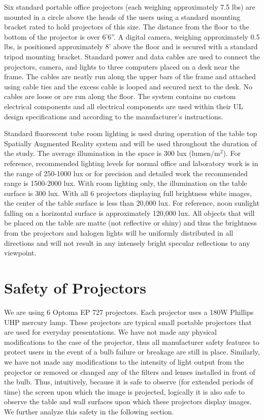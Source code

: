 \documentclass[10pt]{article}
\begin{document}
Six standard portable office projectors (each weighing approximately
7.5 lbs) are mounted in a circle above the heads of the users using a
standard mounting bracket rated to hold projectors of this size.  The distance
from the floor to the bottom of the projector is over 6'6''.  A
digital camera, weighing approximately 0.5 lbs, is positioned
approximately 8' above the floor and is secured with a standard tripod
mounting bracket.  Standard power and data cables are used to connect
the projectors, camera, and lights to three computers placed on a desk
near the frame.  The cables are neatly run along the upper bars of the
frame and attached using cable ties and the excess cable is looped and
secured next to the desk.  No cables are loose or are run along the
floor.  The system contains no custom electrical components and all
electrical components are used within their UL design specifications
and according to the manufacturer's instructions.

Standard fluorescent tube room lighting is used during operation of
the table top Spatially Augmented Reality system and will be used
throughout the duration of the study.  The average illumination in the
space is 300 lux (lumen/m$^2$).  For reference, recommended lighting
levels for normal office and laboratory work is in the range of
250-1000 lux or for precision and detailed work the recommended range
is 1500-2000 lux.  With room lighting only, the illumination on the
table surface is 300 lux.  With all 6 projectors displaying full
brightness white images, the center of the table surface is less than
20,000 lux.  For reference, noon sunlight falling on a horizontal
surface is approximately 120,000 lux.  All objects that will be placed
on the table are matte (not reflective or shiny) and thus the
brightness from the projectors and halogen lights will be uniformly
distributed in all directions and will not result in any intensely
bright specular reflections to any viewpoint.

\section{Safety of Projectors}

We are using 6 Optoma EP 727 projectors.  Each projector uses a 180W
Phillips UHP mercury lamp.  These projectors are typical small
portable projectors that are used for everyday presentations.  We have
not made any physical modifications to the case of the projector, thus
all manufacturer safety features to protect users in the event of a
bulb failure or breakage are still in place.  Similarly, we have not
made any modifications to the intensity of light output from the
projector or removed or changed any of the filters and lenses
installed in front of the bulb.  Thus, intuitively, because it is safe
to observe (for extended periods of time) the screen upon which the
image is projected, logically it is also safe to observe the table and
wall surfaces upon which these projectors display images.  We further
analyze this safety in the following section.
\end{document}

